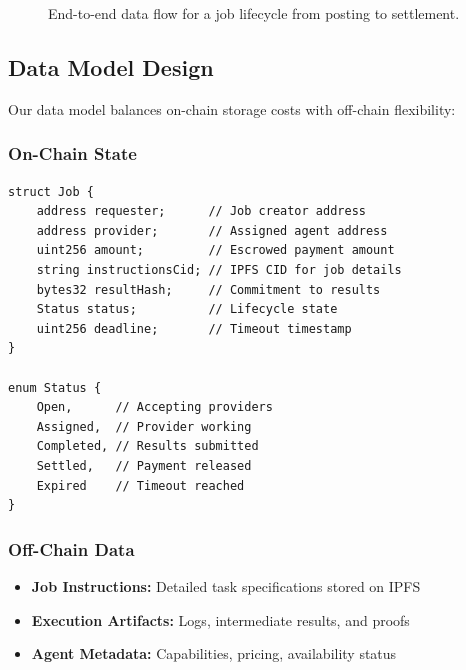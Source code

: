 \begin{figure}[h]
    \centering
    \caption{End-to-end data flow for a job lifecycle from posting to settlement.}
    \label{fig:dataflow}
\end{figure}

\subsection{Data Model Design}

Our data model balances on-chain storage costs with off-chain flexibility:

\subsubsection{On-Chain State}
\begin{lstlisting}[language=Solidity, caption=Core on-chain data structures]
struct Job {
    address requester;      // Job creator address
    address provider;       // Assigned agent address
    uint256 amount;         // Escrowed payment amount
    string instructionsCid; // IPFS CID for job details
    bytes32 resultHash;     // Commitment to results
    Status status;          // Lifecycle state
    uint256 deadline;       // Timeout timestamp
}

enum Status {
    Open,      // Accepting providers
    Assigned,  // Provider working
    Completed, // Results submitted
    Settled,   // Payment released
    Expired    // Timeout reached
}
\end{lstlisting}

\subsubsection{Off-Chain Data}
\begin{itemize}
    \item \textbf{Job Instructions:} Detailed task specifications stored on IPFS
    \item \textbf{Execution Artifacts:} Logs, intermediate results, and proofs
    \item \textbf{Agent Metadata:} Capabilities, pricing, availability status
\end{itemize}


